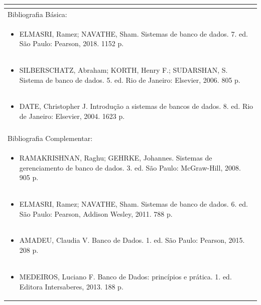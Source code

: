 \documentclass[11pt]{article}
\begin{document}
\begin{center}
\begin{longtable}{|p{4cm}|p{4cm}|p{4cm}|p{4cm}|}
\multicolumn{4}{|p{\dimexpr 16cm + 6\tabcolsep\relax}|}{}\\
\hline
\multicolumn{4}{|p{16cm}|}{Bibliografia Básica:}\\*
\multicolumn{4}{|p{\dimexpr 16cm + 6\tabcolsep\relax}|}{\begin{itemize}\item ELMASRI, Ramez; NAVATHE, Sham. Sistemas de banco de dados. 7. ed. São Paulo: Pearson, 2018. 1152 p.\end{itemize}}\\
\multicolumn{4}{|p{\dimexpr 16cm + 6\tabcolsep\relax}|}{\begin{itemize}\item SILBERSCHATZ, Abraham; KORTH, Henry F.; SUDARSHAN, S. Sistema de banco de dados. 5. ed. Rio de Janeiro: Elsevier, 2006. 805 p.\end{itemize}}\\
\multicolumn{4}{|p{\dimexpr 16cm + 6\tabcolsep\relax}|}{\begin{itemize}\item DATE, Christopher J. Introdução a sistemas de bancos de dados. 8. ed. Rio de Janeiro: Elsevier, 2004. 1623 p.\end{itemize}}\\
\multicolumn{4}{|p{16cm}|}{}\\
\hline
\multicolumn{4}{|p{16cm}|}{Bibliografia Complementar:}\\*
\multicolumn{4}{|p{\dimexpr 16cm + 6\tabcolsep\relax}|}{\begin{itemize}\item RAMAKRISHNAN, Raghu; GEHRKE, Johannes. Sistemas de gerenciamento de banco de dados. 3. ed. São Paulo: McGraw-Hill, 2008. 905 p.\end{itemize}}\\
\multicolumn{4}{|p{\dimexpr 16cm + 6\tabcolsep\relax}|}{\begin{itemize}\item ELMASRI, Ramez; NAVATHE, Sham. Sistemas de banco de dados. 6. ed. São Paulo: Pearson, Addison Wesley, 2011. 788 p.\end{itemize}}\\
\multicolumn{4}{|p{\dimexpr 16cm + 6\tabcolsep\relax}|}{\begin{itemize}\item AMADEU, Claudia V. Banco de Dados. 1. ed. São Paulo: Pearson, 2015. 208 p.\end{itemize}}\\
\multicolumn{4}{|p{\dimexpr 16cm + 6\tabcolsep\relax}|}{\begin{itemize}\item MEDEIROS, Luciano F. Banco de Dados: princípios e prática. 1. ed. Editora Intersaberes, 2013. 188 p.\end{itemize}}\\

\end{longtable}
\end{center}
\end{document}
